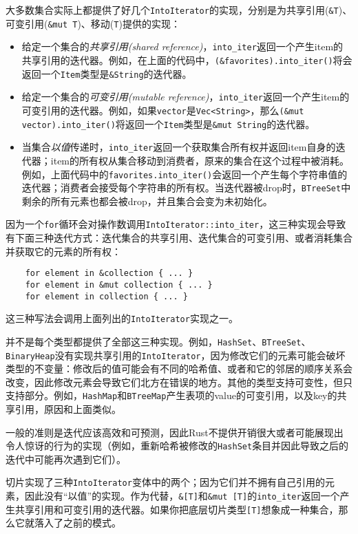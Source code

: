 大多数集合实际上都提供了好几个\texttt{IntoIterator}的实现，分别是为共享引用(\texttt{\&T})、可变引用(\texttt{\&mut T})、移动(\texttt{T})提供的实现：
\begin{itemize}
    \item 给定一个集合的\emph{共享引用(shared reference)}，\texttt{into\_iter}返回一个产生item的共享引用的迭代器。例如，在上面的代码中，\texttt{(\&favorites).into\_iter()}将会返回一个\texttt{Item}类型是\texttt{\&String}的迭代器。
    \item 给定一个集合的\emph{可变引用(mutable reference)}，\texttt{into\_iter}返回一个产生item的可变引用的迭代器。例如，如果\texttt{vector}是\texttt{Vec<String>}，那么\texttt{(\&mut vector).into\_iter()}将返回一个\texttt{Item}类型是\texttt{\&mut String}的迭代器。
    \item 当集合\emph{以值}传递时，\texttt{into\_iter}返回一个获取集合所有权并返回item自身的迭代器；item的所有权从集合移动到消费者，原来的集合在这个过程中被消耗。例如，上面代码中的\texttt{favorites.into\_iter()}会返回一个产生每个字符串值的迭代器；消费者会接受每个字符串的所有权。当迭代器被drop时，\texttt{BTreeSet}中剩余的所有元素也都会被drop，并且集合会变为未初始化。
\end{itemize}

因为一个\texttt{for}循环会对操作数调用\texttt{IntoIterator::into\_iter}，这三种实现会导致有下面三种迭代方式：迭代集合的共享引用、迭代集合的可变引用、或者消耗集合并获取它的元素的所有权：
\begin{verbatim}
    for element in &collection { ... }
    for element in &mut collection { ... }
    for element in collection { ... }
\end{verbatim}

这三种写法会调用上面列出的\texttt{IntoIterator}实现之一。

并不是每个类型都提供了全部这三种实现。例如，\texttt{HashSet}、\texttt{BTreeSet}、\texttt{BinaryHeap}没有实现共享引用的\texttt{IntoIterator}，因为修改它们的元素可能会破坏类型的不变量：修改后的值可能会有不同的哈希值、或者和它的邻居的顺序关系会改变，因此修改元素会导致它们北方在错误的地方。其他的类型支持可变性，但只支持部分。例如，\texttt{HashMap}和\texttt{BTreeMap}产生表项的value的可变引用，以及key的共享引用，原因和上面类似。

一般的准则是迭代应该高效和可预测，因此Rust不提供开销很大或者可能展现出令人惊讶的行为的实现（例如，重新哈希被修改的\texttt{HashSet}条目并因此导致之后的迭代中可能再次遇到它们）。

切片实现了三种\texttt{IntoIterator}变体中的两个；因为它们并不拥有自己引用的元素，因此没有“以值”的实现。作为代替，\texttt{\&[T]}和\texttt{\&mut [T]}的\texttt{into\_iter}返回一个产生共享引用和可变引用的迭代器。如果你把底层切片类型\texttt{[T]}想象成一种集合，那么它就落入了之前的模式。

